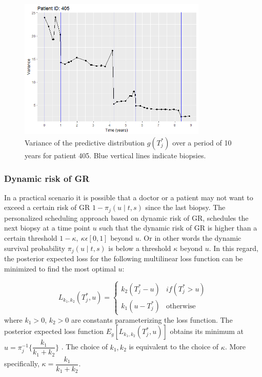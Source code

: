 \begin{figure}[!htb]
	\centering
    \captionsetup{justification=centering}
	\includegraphics[width=0.8\textwidth]{images/variance_pred_dist.png}
	\caption{Variance of the predictive distribution $g(T^*_j)$ over a period of 10 years for patient 405. Blue vertical lines indicate biopsies.}
	\label{fig : variance_pred_dist}
\end{figure}

\subsubsection{Dynamic risk of GR}
\label{subsubsec : dynamic_risk_definitions}
In a practical scenario it is possible that a doctor or a patient may not want to exceed a certain risk of GR $1 - \pi_j(u \mid t, s)$ since the last biopsy. The personalized scheduling approach based on dynamic risk of GR, schedules the next biopsy at a time point $u$ such that the dynamic risk of GR is higher than a certain threshold $1-\kappa,\ \kappa \epsilon [0,1]$ beyond $u$. Or in other words the dynamic survival probability $\pi_j(u \mid t, s)$ is below a threshold $\kappa$ beyond $u$. In this regard, the posterior expected loss for the following multilinear loss function can be minimized to find the most optimal $u$:

\begin{equation}
\label{eq : loss_dynamic_risk}
L_{k_1, k_2}(T^*_j, u) =
    \begin{cases}
      k_2(T^*_j-u) & if(T^*_j > u)\\
      k_1(u-T^*_j) & \text{otherwise}
    \end{cases}       
\end{equation}
where $k_1 > 0$, $k_2 > 0$ are constants parameterizing the loss function. The posterior expected loss function $E_g[L_{k_1, k_2}(T^*_j, u)]$ obtains its minimum at $u = \pi_j^{-1}\Big\{\dfrac{k_1}{k_1 + k_2}\Big\}$ \citep{robertBayesianChoice}. The choice of $k_1, k_2$ is equivalent to the choice of $\kappa$. More specifically, $\kappa = \dfrac{k_1}{k_1 + k_2}$. 

